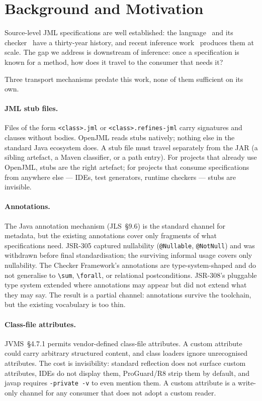 \section{Background and Motivation}
\label{sec:background}

Source-level JML specifications are well established: the language~\cite{jml,leavens2006design} and its checker~\cite{openjml} have a thirty-year history, and recent inference work~\cite{edmonds2026inference} produces them at scale. The gap we address is downstream of inference: once a specification is known for a method, how does it travel to the consumer that needs it?

Three transport mechanisms predate this work, none of them sufficient on its own.

\paragraph{JML stub files.}
Files of the form \texttt{<class>.jml} or \texttt{<class>.refines-jml} carry signatures and clauses without bodies. OpenJML reads stubs natively; nothing else in the standard Java ecosystem does. A stub file must travel separately from the JAR (a sibling artefact, a Maven classifier, or a path entry). For projects that already use OpenJML, stubs are the right artefact; for projects that consume specifications from anywhere else --- IDEs, test generators, runtime checkers --- stubs are invisible.

\paragraph{Annotations.}
The Java annotation mechanism (JLS~\S9.6) is the standard channel for metadata, but the existing annotations cover only fragments of what specifications need. JSR-305 captured nullability (\texttt{@Nullable}, \texttt{@NotNull}) and was withdrawn before final standardisation; the surviving informal usage covers only nullability. The Checker Framework's annotations are type-system-shaped and do not generalise to \texttt{\textbackslash sum}, \texttt{\textbackslash forall}, or relational postconditions. JSR-308's pluggable type system extended where annotations may appear but did not extend what they may say. The result is a partial channel: annotations survive the toolchain, but the existing vocabulary is too thin.

\paragraph{Class-file attributes.}
JVMS~\S4.7.1 permits vendor-defined class-file attributes. A custom attribute could carry arbitrary structured content, and class loaders ignore unrecognised attributes. The cost is invisibility: standard reflection does not surface custom attributes, IDEs do not display them, ProGuard/R8 strip them by default, and javap requires \texttt{-private -v} to even mention them. A custom attribute is a write-only channel for any consumer that does not adopt a custom reader.

